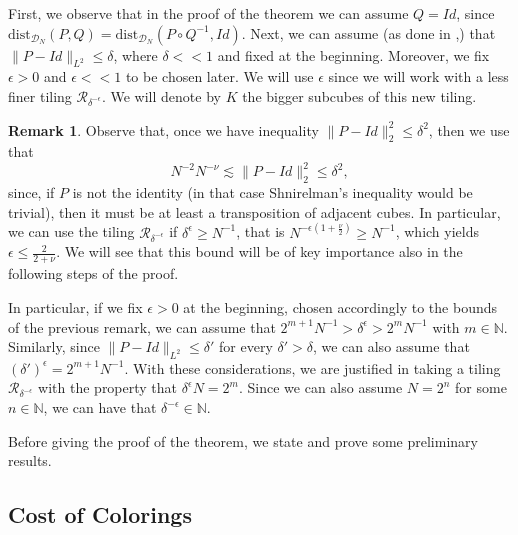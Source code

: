 \documentclass[12 pt]{article}
\theoremstyle{definition} \newtheorem{definition}{Definition}[section]
\theoremstyle{definition} \newtheorem{remark}[definition]{Remark}
\theoremstyle{plain} \newtheorem{lemma}[definition]{Lemma}
\theoremstyle{plain} \newtheorem{proposition}[definition]{Proposition}
\theoremstyle{plain} \newtheorem{theorem}[definition]{Theorem}
\theoremstyle{plain} \newtheorem{corollary}[definition]{Corollary}
\theoremstyle{definition} \newtheorem{example}[definition]{Example}
\theoremstyle{definition} \newtheorem{assumption}[definition]{Assumption}
\theoremstyle{definition} \newtheorem{conjecture}[definition]{Conjecture}
\newcommand{\N}{\mathbb{N}}
\newcommand{\1}{\mathbbm 1}
\numberwithin{equation}{section}
\begin{document}
First, we observe that in the proof of the theorem we can assume $Q=Id$, since $\text{dist}_{\mathcal{D}_N}(P,Q)=\text{dist}_{\mathcal{D}_N}(P\circ Q^{-1},Id)$. Next, we can assume (as done in \cite{Shnirelman},\cite{Shnirelman2}) that $\|P-Id\|_{L^2}\leq \delta$, where $\delta<<1$ and fixed at the beginning. 
Moreover, we fix $\epsilon>0$ and $\epsilon <<1$ to be chosen later. We will use $\epsilon$ since we will work with a less finer tiling $\mathcal{R}_{\delta^{-\epsilon}}$. We will denote by $K$ the bigger subcubes of this new tiling.

\begin{remark}\label{rmk:cound:eps}
    Observe that, once we have inequality $\|P-Id\|_2^2\leq\delta^2$, then we use that
    \begin{equation*}
        N^{-2}N^{-\nu}\lesssim \|P-Id\|_2^2\leq\delta^2,
    \end{equation*}
    since, if $P$ is not the identity (in that case Shnirelman's inequality would be trivial), then it must be at least a transposition of adjacent cubes. In particular, we can use the tiling $\mathcal{R}_{\delta^{-\epsilon}}$  if $\delta^\epsilon\geq N^{-1}$, that is $N^{-\epsilon\left(1+\frac{\nu}{2}\right)}\geq N^{-1}$, which yields $\epsilon\leq\frac{2}{2+\nu}$. We will see that this bound will be of key importance also in the following steps of the proof. 
\end{remark}
\medskip


In particular, if we fix $\epsilon>0$ at the beginning, chosen accordingly to the bounds of the previous remark, we can assume that $2^{m+1}N^{-1}>\delta^\epsilon>{2^m}N^{-1}$ with $m\in\N$. Similarly, since $\|P-Id\|_{L^2}\leq \delta'$ for every $\delta'>\delta$, we can also assume that $(\delta')^\epsilon=2^{m+1}N^{-1}.$ With these considerations, we are justified in taking a tiling $\mathcal{R}_{\delta^{-\epsilon}}$ with the property that $\delta^\epsilon N=2^m$. Since we can also assume $N=2^n$ for some $n\in\N$, we can have that $\delta^{-\epsilon}\in\N$.

\medskip
Before giving the proof of the theorem, we state and prove some preliminary results.

\subsection{Cost of Colorings}\label{S:cost:coloring}
\end{document}
